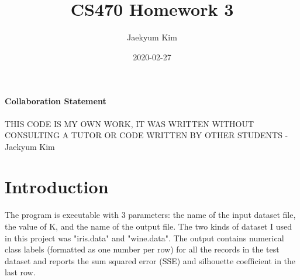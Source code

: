 \documentclass{article}
\title{CS470 Homework 3}
\date{2020-02-27}
\author{Jaekyum Kim}
\begin{document}
  \maketitle
  \newpage
\paragraph{Collaboration Statement}
THIS CODE IS MY OWN WORK, IT WAS WRITTEN WITHOUT CONSULTING A TUTOR OR CODE WRITTEN BY OTHER STUDENTS - Jaekyum Kim

\section{Introduction}
The program is executable with 3 parameters: the name of the input dataset file, the value of K, and the name of the output file. The two kinds of dataset I used in this project was "iris.data" and "wine.data". The output contains numerical class labels (formatted as one number per row) for all the records in the test dataset and reports the sum squared error (SSE) and silhouette coefficient in the last row. 
\end{document}
